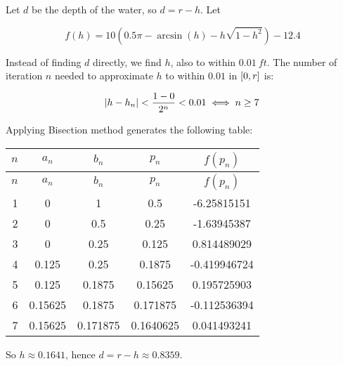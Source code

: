\documentclass[../../Assignments.tex]{subfiles}
\begin{document}
\begin{solution}
    Let \(d\) be the depth of the water, so \(d = r - h\). Let

    \[f(h) = 10 (\num{0.5} \pi - \arcsin(h) - h \sqrt{1 - h^2}) - \num{12.4}\]

    Instead of finding \(d\) directly, we find \(h\), also to within
    \(\SI{0.01}{ft}\). The number of iteration \(n\) needed to approximate \(h\)
    to within \(\num{0.01}\) in \(\interval{0}{r}\) is:

    \[\abs{h - h_n} < \frac{1 - 0}{2^n} < 0.01 \iff n \geq 7\]

    Applying Bisection method generates the following table:

    \begin{longtable}{r S[table-format=1.5] S[table-format=1.6] S[table-format=1.7] S[table-format=-1.9]}
        \toprule
        \(n\)  &   {\(a_n\)}   &   {\(b_n\)}   &   {\(p_n\)}   &  {\(f(p_n)\)}  \\
        \midrule
        \endfirsthead
        \(n\)  &   {\(a_n\)}   &   {\(b_n\)}   &   {\(p_n\)}   &  {\(f(p_n)\)}  \\
        \midrule
          &  0            &  1            &  0.5          &  -6.25815151   \\
            2  &  0            &  0.5          &  0.25         &  -1.63945387   \\
            3  &  0            &  0.25         &  0.125        &   0.814489029  \\
            4  &  0.125        &  0.25         &  0.1875       &  -0.419946724  \\
            5  &  0.125        &  0.1875       &  0.15625      &   0.195725903  \\
            6  &  0.15625      &  0.1875       &  0.171875     &  -0.112536394  \\
            7  &  0.15625      &  0.171875     &  0.1640625    &   0.041493241  \\
        \bottomrule
    \end{longtable}

    So \(h \approx \num{0.1641}\), hence \(d = r - h \approx \num{0.8359}\).
\end{solution}
\end{document}
